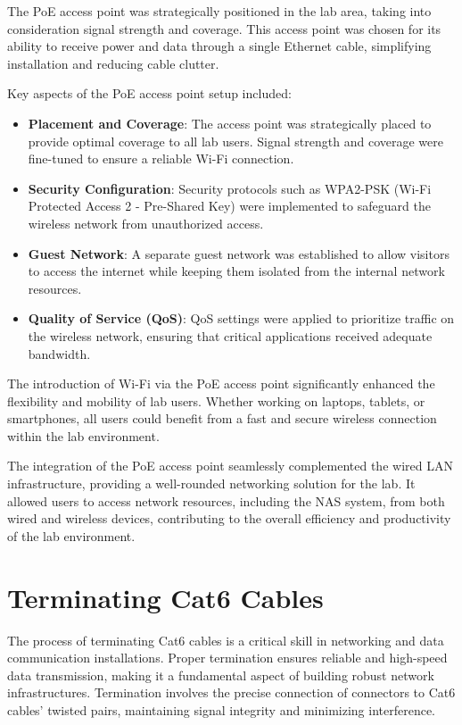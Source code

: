 The PoE access point was strategically positioned in the lab area, taking into consideration signal strength and coverage. This access point was chosen for its ability to receive power and data through a single Ethernet cable, simplifying installation and reducing cable clutter.

Key aspects of the PoE access point setup included:

\begin{itemize}
    \item \textbf{Placement and Coverage}: The access point was strategically placed to provide optimal coverage to all lab users. Signal strength and coverage were fine-tuned to ensure a reliable Wi-Fi connection.
    
    \item \textbf{Security Configuration}: Security protocols such as WPA2-PSK (Wi-Fi Protected Access 2 - Pre-Shared Key) were implemented to safeguard the wireless network from unauthorized access.
    
    \item \textbf{Guest Network}: A separate guest network was established to allow visitors to access the internet while keeping them isolated from the internal network resources.
    
    \item \textbf{Quality of Service (QoS)}: QoS settings were applied to prioritize traffic on the wireless network, ensuring that critical applications received adequate bandwidth.
\end{itemize}

The introduction of Wi-Fi via the PoE access point significantly enhanced the flexibility and mobility of lab users. Whether working on laptops, tablets, or smartphones, all users could benefit from a fast and secure wireless connection within the lab environment.

The integration of the PoE access point seamlessly complemented the wired LAN infrastructure, providing a well-rounded networking solution for the lab. It allowed users to access network resources, including the NAS system, from both wired and wireless devices, contributing to the overall efficiency and productivity of the lab environment.
\section{Terminating Cat6 Cables}

The process of terminating Cat6 cables is a critical skill in networking and data communication installations. Proper termination ensures reliable and high-speed data transmission, making it a fundamental aspect of building robust network infrastructures. Termination involves the precise connection of connectors to Cat6 cables' twisted pairs, maintaining signal integrity and minimizing interference.

